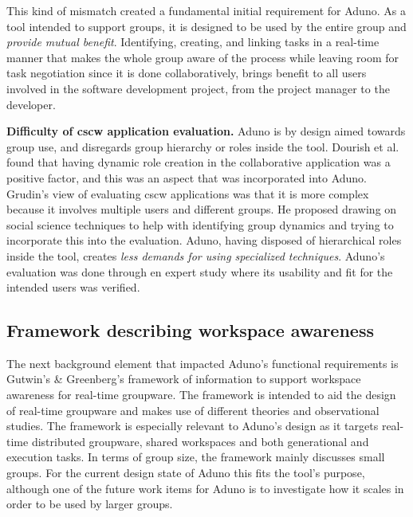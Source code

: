 \documentclass[conference]{IEEEtran}
\begin{document}
This kind of mismatch created a fundamental initial requirement for Aduno. As a tool intended to support groups, it is designed to be used by the entire group and \textit{provide mutual benefit}. Identifying, creating, and linking tasks in a real-time manner that makes the whole group aware of the process while leaving room for task negotiation since it is done collaboratively, brings benefit to all users involved in the software development project, from the project manager to the developer.

\textbf{Difficulty of {\sc cscw} application evaluation.} Aduno is by design aimed towards group use, and disregards group hierarchy or roles inside the tool.  Dourish et al. found that having dynamic role creation in the collaborative application was a positive factor\cite{Dourish:1992:ACS:143457.143468}, and this was an aspect that was incorporated into Aduno. Grudin's view of evaluating {\sc cscw} applications was that it is more complex because it involves multiple users and different groups. He proposed drawing on social science techniques to help with identifying group dynamics and trying to incorporate this into the evaluation. Aduno, having disposed of hierarchical roles inside the tool, creates \textit{less demands for using specialized techniques}. Aduno's evaluation was done through en expert study where its usability and fit for the intended users was verified.

\subsection{Framework describing workspace awareness}
The next background element that impacted Aduno's functional requirements is Gutwin's \& Greenberg's \cite{GG02} framework of information to support workspace awareness for real-time groupware. The framework is intended to aid the design of real-time groupware and makes use of different theories and observational studies. The framework is especially relevant to Aduno's design as it targets real-time distributed groupware, shared workspaces and both generational and execution tasks. In terms of group size, the framework mainly discusses small groups. For the current design state of Aduno this fits the tool's purpose, although one of the future work items for Aduno is to investigate how it scales in order to be used by larger groups.
\end{document}
